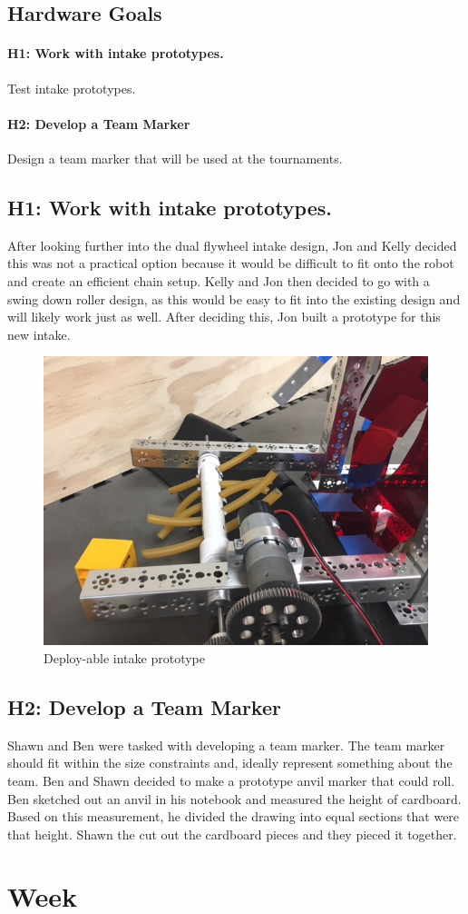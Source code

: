 \documentclass{article}
\begin{document}
\subsection{Hardware Goals}
\paragraph{H1: Work with intake prototypes.}
 Test intake prototypes. 
\paragraph{H2: Develop a Team Marker}
 Design a team marker that will be used at the tournaments.
\newpage
\subsection{H1: Work with intake prototypes.}

After looking further into the dual flywheel intake design, Jon and Kelly decided this was not a practical option because it would be difficult to fit onto the robot and create an efficient chain setup. Kelly and Jon then decided to go with a swing down roller design, as this would be easy to fit into the existing design and will likely work just as well. After deciding this, Jon built a prototype for this new intake. 

\begin{figure}
    \centering
    \includegraphics[width=.6\textwidth]{03_09-17/images/IMG_0262.JPG}
    \caption{Deploy-able intake prototype}
    \label{fig:my_label}
\end{figure}

\subsection{H2: Develop a Team Marker}

Shawn and Ben were tasked with developing a team marker. The team marker should fit within the size constraints and, ideally represent something about the team. Ben and Shawn decided to make a prototype anvil marker that could roll. Ben sketched out an anvil in his notebook and measured the height of cardboard. Based on this measurement, he divided the drawing into equal sections that were that height. Shawn the cut out the cardboard pieces and they pieced it together.\clearpage \newpage \section{Week \thesection} 
\end{document}
